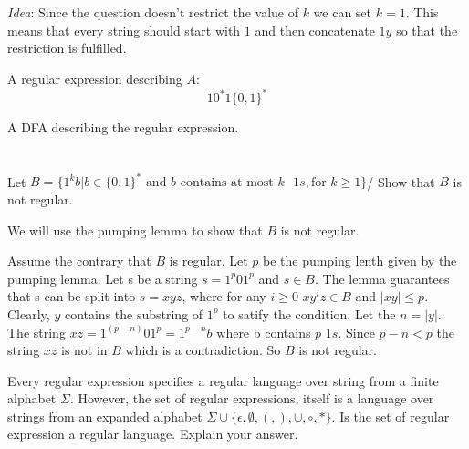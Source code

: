 \begin{solution}

  \begin{parts}


    \part{}
    \emph{Idea}: Since the question doesn't restrict the value of $k$ we can set $k=1$. This means that every string should start with $1$ and then concatenate $1y$ so that the restriction is fulfilled.

    A regular expression describing $A$:
    \[10^{*}1\{0,1\}^{*}\]

    A DFA describing the regular expression.


    \part{} Let $B = \{1^{k}b | b\in \{0,1\}^{*} \text{ and } b \text{ contains at most } k\text{ }1s, \text{for } k\geq 1 \}$/ Show that $B$ is not regular.

    We will use the pumping lemma to show that $B$ is not regular.

    Assume the contrary that $B$ is regular. Let $p$ be the pumping lenth given by the pumping lemma. Let s be a string $s = 1^{p}01^{p}$ and $s\in B$. The lemma guarantees that s can be split into $s = xyz$, where for any $i\geq 0$ $xy^{i}z \in B$ and $|xy| \le p$. Clearly, $y$ contains the substring of $1^{p}$ to satify the condition. Let the $n=|y|$. The string $xz=1^{(p-n)}01^{p} = 1^{p-n}b$ where b contains $p$ $1s$. Since $p-n < p$ the string $xz$ is not in $B$ which is a contradiction. So $B$ is not regular.

    \end{parts}
\end{solution}


\question %
Every regular expression specifies a regular language over string from a finite alphabet $\Sigma$. However, the set of regular expressions, itself is a language over strings from an expanded alphabet $\Sigma \cup \{\epsilon, \emptyset, (,), \cup, \circ, *\}$. Is the set of regular expression a regular language. Explain your answer.


